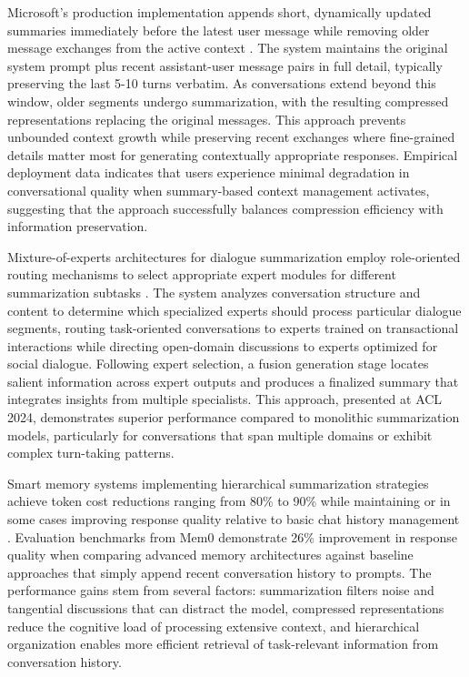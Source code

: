 Microsoft's production implementation appends short, dynamically updated summaries immediately before the latest user message while removing older message exchanges from the active context \citep{microsoft2024infinite}. The system maintains the original system prompt plus recent assistant-user message pairs in full detail, typically preserving the last 5-10 turns verbatim. As conversations extend beyond this window, older segments undergo summarization, with the resulting compressed representations replacing the original messages. This approach prevents unbounded context growth while preserving recent exchanges where fine-grained details matter most for generating contextually appropriate responses. Empirical deployment data indicates that users experience minimal degradation in conversational quality when summary-based context management activates, suggesting that the approach successfully balances compression efficiency with information preservation.

Mixture-of-experts architectures for dialogue summarization employ role-oriented routing mechanisms to select appropriate expert modules for different summarization subtasks \citep{wang2024dialogue}. The system analyzes conversation structure and content to determine which specialized experts should process particular dialogue segments, routing task-oriented conversations to experts trained on transactional interactions while directing open-domain discussions to experts optimized for social dialogue. Following expert selection, a fusion generation stage locates salient information across expert outputs and produces a finalized summary that integrates insights from multiple specialists. This approach, presented at ACL 2024, demonstrates superior performance compared to monolithic summarization models, particularly for conversations that span multiple domains or exhibit complex turn-taking patterns.

Smart memory systems implementing hierarchical summarization strategies achieve token cost reductions ranging from 80\% to 90\% while maintaining or in some cases improving response quality relative to basic chat history management \citep{mem0ai2025guide}. Evaluation benchmarks from Mem0 demonstrate 26\% improvement in response quality when comparing advanced memory architectures against baseline approaches that simply append recent conversation history to prompts. The performance gains stem from several factors: summarization filters noise and tangential discussions that can distract the model, compressed representations reduce the cognitive load of processing extensive context, and hierarchical organization enables more efficient retrieval of task-relevant information from conversation history.

